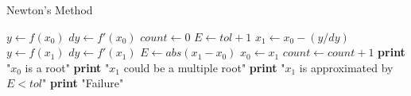 \documentclass{article}
\begin{document}
	\begin{algorithm}
		\caption{Newton's Method}
		\begin{algorithmic}[1]
				\State $y \gets f(x_{0})$
				\State $dy \gets f'(x_{0})$
				\State $count \gets 0$
				\State $E \gets tol + 1$
					\State $x_{1} \gets x_{0} - (y/dy)$
					\State $y \gets f(x_{1})$
					\State $dy \gets f'(x_{1})$
					\State $E \gets abs(x_{1} - x_{0})$
					\State $x_{0} \gets x_{1}$
					\State $count \gets count + 1$
				\EndWhile
					\State \textbf{print} "$x_{0}$ is a root"
					\State \textbf{print} "$x_{1}$ could be a multiple root"
					\State \textbf{print} "$x_{1}$ is approximated by $E < tol$"
				\Else
					\State \textbf{print} "Failure"
				\EndIf
			\EndProcedure
		\end{algorithmic}
	\end{algorithm}
\end{document}
